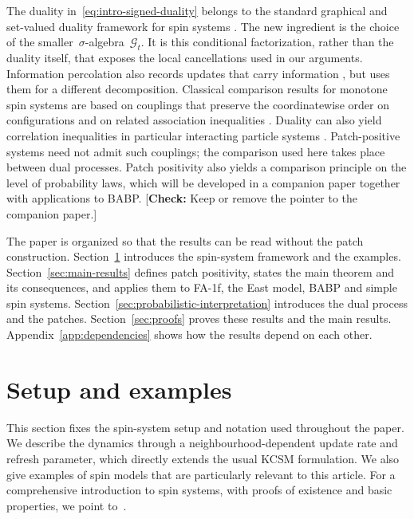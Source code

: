 \documentclass[EJP,preprint,NODS,nobera]{ejpecp}
\newcommand{\authorcheck}[1]{{\color{blue}[\textbf{Check:} #1]}}
\begin{document}
The duality in~\eqref{eq:intro-signed-duality} belongs to the standard
graphical and set-valued duality framework for spin systems
\cite{Harris1974,Harris1978,Griffeath1979,HolleyStroock1979,Gray1986,JansenKurt2014}.
The new ingredient is the choice of the smaller~$\sigma$-algebra~$\mathcal G_t$.
It is this conditional factorization, rather than the duality itself, that
exposes the local cancellations used in our arguments. Information
percolation also records updates that carry information
\cite{LubetzkySly2016}, but uses them for a different decomposition.
Classical comparison results for monotone spin systems are based on couplings
that preserve the coordinatewise order on configurations and on related
association inequalities \cite{Harris1977,Liggett1985,Liggett2006}. Duality
can also yield correlation inequalities in particular interacting particle
systems \cite{GiardinaRedigVafayi2010}. Patch-positive systems need not admit
such couplings; the comparison used here takes place between dual processes.
Patch positivity also yields a comparison principle on the level of
probability laws, which will be developed in a companion paper together with
applications to BABP. \authorcheck{Keep or remove the pointer to the
companion paper.}

The paper is organized so that the results can be read without the patch
construction. Section~\ref{sec:setup} introduces the spin-system framework
and the examples. Section~\ref{sec:main-results} defines patch positivity,
states the main theorem and its consequences, and applies them to FA-1f, the
East model, BABP and simple spin systems.
Section~\ref{sec:probabilistic-interpretation} introduces the dual process
and the patches. Section~\ref{sec:proofs} proves these
results and the main results. Appendix~\ref{app:dependencies} shows how the
results depend on each other.

\section{Setup and examples}
\label{sec:setup}

This section fixes the spin-system setup and notation used throughout the paper.
We describe the dynamics through a neighbourhood-dependent update rate and
refresh parameter, which directly extends the usual KCSM formulation. We also give examples of spin models that are particularly relevant to this article. For a comprehensive introduction to spin systems, with proofs of existence and basic properties, we point to~\cite{Liggett1985}.
\end{document}
